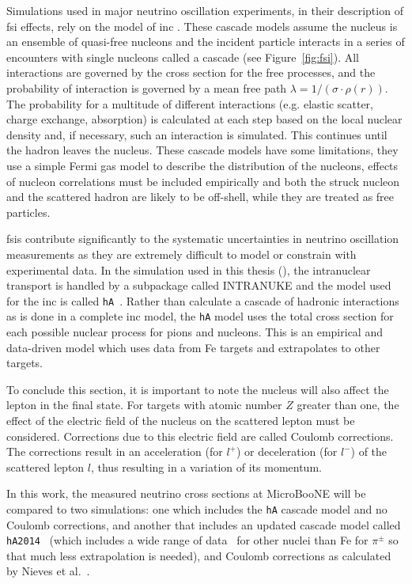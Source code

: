 Simulations used in major neutrino oscillation experiments, in their description of \acrshort{fsi} effects, rely on the model of \acrfull{inc} \cite{inc}. These cascade models assume the nucleus is an ensemble of quasi-free nucleons and the incident particle interacts in a series of encounters with single nucleons called a cascade (see Figure~\ref{fig:fsi}).
All interactions are governed by the cross section for the free processes, and the probability of interaction is governed by a mean free path $\lambda = 1/(\sigma\cdot\rho(r))$. The probability for a multitude of different interactions (e.g. elastic scatter, charge exchange, absorption) is calculated at each step based on the local nuclear density and, if necessary, such an interaction is simulated. This continues until the hadron leaves the nucleus. These cascade models have some limitations, they use a simple Fermi gas model to describe the distribution of the nucleons, effects of nucleon correlations must be included empirically and both the struck nucleon and the scattered hadron are likely to be off-shell, while they are treated as free particles.

\acrshort{fsi}s contribute significantly to the systematic uncertainties in neutrino oscillation measurements as they are extremely difficult to model or constrain with experimental data. In the simulation used in this thesis (\g), the intranuclear transport is handled by a subpackage called INTRANUKE and the model used for the \acrshort{inc} is called \texttt{hA}~\cite{GENIE_reweighting}. Rather than calculate a cascade of hadronic interactions as is done in a complete \acrshort{inc} model, the \texttt{hA} model uses the total cross section for each possible nuclear process for pions and nucleons. This is an empirical and data-driven model \cite{GENIE_reweighting} which uses data from Fe targets and extrapolates to other targets.

To conclude this section, it is important to note the nucleus will also affect the lepton in the final state. For targets with atomic number $Z$ greater than one, the effect of the electric field of the nucleus on the scattered lepton must be considered. Corrections due to this electric field are called Coulomb corrections. The corrections result in an acceleration (for $l^+$) or deceleration (for $l^-$) of the scattered lepton $l$, thus resulting in a variation of its momentum.

In this work, the measured neutrino cross sections at MicroBooNE will be compared to two \g simulations: one which includes the \texttt{hA} cascade model and no Coulomb corrections, and another that includes an updated cascade model called  \texttt{hA2014}~\cite{genie_production_release} (which includes a wide range of data~\cite{ashery} for other nuclei than Fe for $\pi^{\pm}$ so that much less extrapolation is needed), and Coulomb corrections as calculated by Nieves et al.~\cite{nieves, nieves2}.



